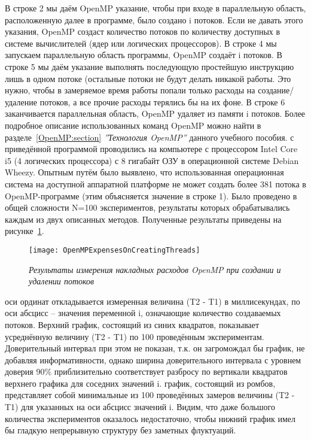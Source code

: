 {	\begin{figure}[H]
		
	\end{figure}
	В строке 2 мы даём OpenMP указание, чтобы при входе в параллельную область, расположенную далее в программе, было создано i потоков. Если не давать этого указания, OpenMP создаст количество потоков по количеству доступных в системе вычислителей (ядер или логических процессоров). В строке 4 мы запускаем параллельную область программы, OpenMP создаёт i потоков. В строке 5 мы даём указание выполнять последующую простейшую инструкцию лишь в одном потоке (остальные потоки не будут делать никакой работы. Это нужно, чтобы в замеряемое время работы попали только расходы на создание/удаление потоков, а все прочие расходы терялись бы на их фоне. В строке 6 заканчивается параллельная область, OpenMP удаляет из памяти i потоков. Более подробное описание использованных команд OpenMP можно найти в разделе~\ref{OpenMP:section} \textit{''Технология OpenMP''} данного учебного  пособия.
	 с приведённой программой проводились на компьютере с процессором Intel Core i5 (4 логических процессора) с 8 гигабайт ОЗУ в операционной системе Debian Wheezy. Опытным путём было выявлено, что использованная операционная система на доступной аппаратной платформе не может создать более 381 потока в OpenMP-программе (этим объясняется значение в строке 1). Было проведено в общей сложности N=100 экспериментов, результаты которых обрабатывались каждым из двух описанных методов. Полученные результаты приведены на рисунке~\ref{OpenMPExpensesOnCreatingThreads:image}.
	\begin{figure}[H]
		\texttt{[image: OpenMPExpensesOnCreatingThreads]}
		\caption{\textit{Результаты измерения накладных расходов OpenMP при создании и удалении потоков}}
		\label{OpenMPExpensesOnCreatingThreads:image}
	\end{figure} 
	 оси ординат откладывается измеренная величина (T2 - T1) в миллисекундах, по оси абсцисс – значения переменной i, означающие количество создаваемых потоков. Верхний график, состоящий из синих квадратов, показывает усреднённую величину (T2 - T1) по 100 проведённым экспериментам. Доверительный интервал при этом не показан, т.к. он загромождал бы график, не добавляя информативности, однако ширина доверительного интервала с уровнем доверия 90\% приблизительно соответствует разбросу по вертикали квадратов верхнего графика для соседних значений i. 
	 график, состоящий из ромбов, представляет собой минимальные из 100 проведённых замеров величины (T2 -  T1) для указанных на оси абсцисс значений i. Видим, что даже большого количества экспериментов оказалось недостаточно, чтобы нижний график имел бы гладкую непрерывную структуру без заметных флуктуаций.

}